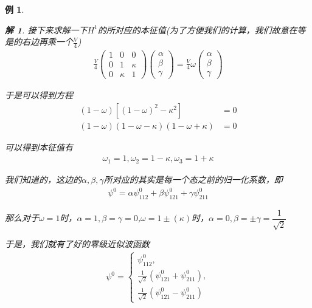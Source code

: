 \documentclass{article}
\newtheorem{example}{例}
\newtheorem{solution}{解}
\begin{document}
\begin{example}
\begin{solution}
    接下来求解一下$H^1$的所对应的本征值(为了方便我们的计算，我们故意在等是的右边再乘一个$\displaystyle\frac{V}{4}$)
    \begin{align*}
        \frac{V}{4}
        \begin{pmatrix}
            1&0&0\\
            0&1&\kappa\\
            0&\kappa&1
        \end{pmatrix}
        \begin{pmatrix}
            \alpha\\\beta\\\gamma
        \end{pmatrix}
        =
        \frac{V}{4}\omega
        \begin{pmatrix}
            \alpha\\\beta\\\gamma
        \end{pmatrix}
    \end{align*}

    于是可以得到方程
    \begin{align*}
        (1-\omega)\left[(1-\omega)^2-\kappa^2\right]&=0\\
        (1-\omega)(1-\omega-\kappa)(1-\omega+\kappa)&=0
    \end{align*}

    可以得到本征值有
    \begin{align*}
        \omega_1=1,\omega_2=1-\kappa,\omega_3=1+\kappa
    \end{align*}

    我们知道的，这边的$\alpha,\beta,\gamma$所对应的其实是每一个态之前的归一化系数，即
    \begin{align*}
        \psi^0=\alpha\psi_{112}^0+\beta\psi_{121}^0+\gamma\psi_{211}^0
    \end{align*}
    
    那么对于$\omega=1$时，$\alpha=1,\beta=\gamma=0$,$\omega=1\pm(\kappa)$时，$\alpha=0,\beta=\pm\gamma=\dfrac{1}{\sqrt{2}}$

    于是，我们就有了好的零级近似波函数
    \begin{align*}
        \displaystyle\psi^0=
        \begin{cases}
            \psi_{112}^0,\\
            \frac{1}{\sqrt{2}}\left(\psi_{121}^0+\psi_{211}^0\right),\\
            \frac{1}{\sqrt{2}}\left(\psi_{121}^0-\psi_{211}^0\right)
        \end{cases}
    \end{align*}


\end{solution}
\end{example}
\end{document}
